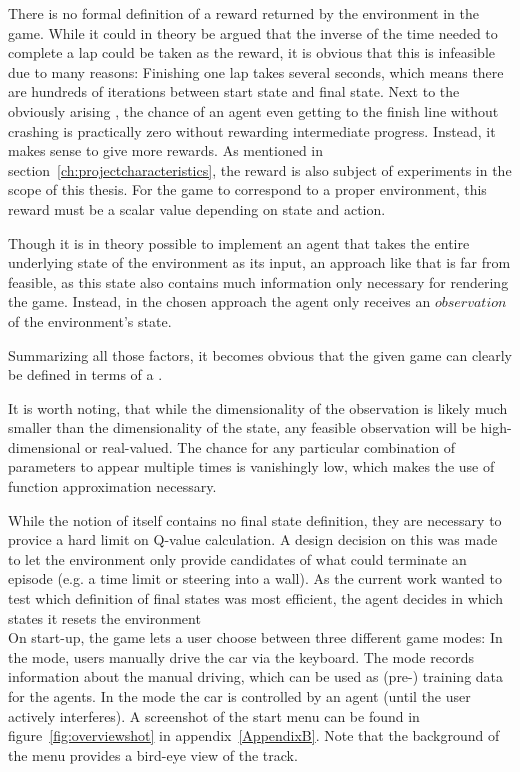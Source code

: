 There is no formal definition of a reward returned by the environment in the game. While it could in theory be argued that the inverse of the time needed to complete a lap could be taken as the reward, it is obvious that this is infeasible due to many reasons: Finishing one lap takes several seconds, which means there are hundreds of iterations between start state and final state. Next to the obviously arising , the chance of an agent even getting to the finish line without crashing is practically zero without rewarding intermediate progress. Instead, it makes sense to give more  rewards. As mentioned in section~\ref{ch:projectcharacteristics}, the reward is also subject of experiments in the scope of this thesis. For the game to correspond to a proper environment, this reward must be a scalar value depending on state and action.

Though it is in theory possible to implement an agent that takes the entire underlying state of the environment as its input, an approach like that is far from feasible, as this state also contains much information only necessary for rendering the game. Instead, in the chosen approach the agent only receives an $observation$ of the environment's state. 

Summarizing all those factors, it becomes obvious that the given game can clearly be defined in terms of a .

It is worth noting, that while the dimensionality of the observation is likely much smaller than the dimensionality of the state, any feasible observation will be high-dimensional or real-valued. The chance for any particular combination of parameters to appear multiple times is vanishingly low, which makes the use of function approximation necessary.

While the notion of  itself contains no final state definition, they are necessary to provice a hard limit on Q-value calculation. A design decision on this was made to let the environment only provide candidates of what could terminate an episode (e.g. a time limit or steering into a wall). As the current work wanted to test which definition of final states was most efficient, the agent decides in which states it resets the environment \\

On start-up, the game lets a user choose between three different game modes: In the  mode, users manually drive the car via the keyboard. The  mode records information about the manual driving, which can be used as (pre-) training data for the agents. In the  mode the car is controlled by an agent (until the user actively interferes). A screenshot of the start menu can be found in figure~\ref{fig:overviewshot} in appendix~\ref{AppendixB}. Note that the background of the menu provides a bird-eye view of the track.

